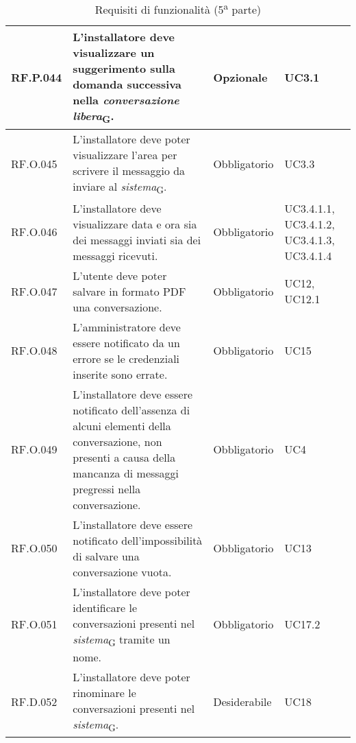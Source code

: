 \begin{table}[H]
\centering
    \begin{tabular}{|C{2.7cm}|L{6.5cm}|C{2.7cm}|C{2.7cm}|}
        \hline
        RF.P.044 & L'installatore deve visualizzare un suggerimento sulla domanda successiva nella \textit{conversazione libera}\textsubscript{G}. & Opzionale & UC3.1 \\ \hline
        RF.O.045 & L'installatore deve poter visualizzare l'area per scrivere il messaggio da inviare al \textit{sistema}\textsubscript{G}. & Obbligatorio & UC3.3 \\ \hline
        RF.O.046 & L'installatore deve visualizzare data e ora sia dei messaggi inviati sia dei messaggi ricevuti. & Obbligatorio & UC3.4.1.1, UC3.4.1.2, UC3.4.1.3, UC3.4.1.4 \\ \hline
        RF.O.047 & L'utente deve poter salvare in formato PDF una conversazione. & Obbligatorio & UC12, UC12.1 \\ \hline
        RF.O.048 & L'amministratore deve essere notificato da un errore se le credenziali inserite sono errate. & Obbligatorio & UC15 \\ \hline
        RF.O.049 & L'installatore deve essere notificato dell'assenza di alcuni elementi della conversazione, non presenti a causa della mancanza di messaggi pregressi nella conversazione. & Obbligatorio & UC4 \\ \hline
        RF.O.050 & L'installatore deve essere notificato dell'impossibilità di salvare una conversazione vuota. & Obbligatorio & UC13
        \\ \hline
        RF.O.051 & L'installatore deve poter identificare le conversazioni presenti nel \textit{sistema}\textsubscript{G} tramite un nome. & Obbligatorio & UC17.2
        \\ \hline
        RF.D.052 & L'installatore deve poter rinominare le conversazioni presenti nel \textit{sistema}\textsubscript{G}. & Desiderabile & UC18
        \\ \hline
    \end{tabular}
    \caption{Requisiti di funzionalità (5\textsuperscript{a}  parte)}
\end{table}

\newpage